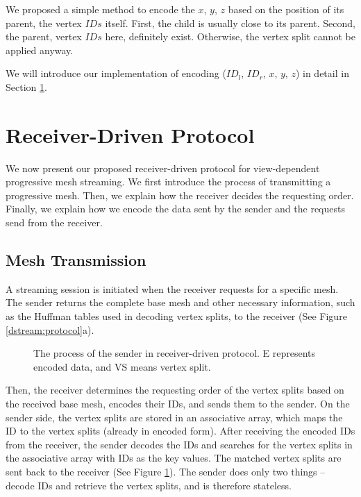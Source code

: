     We proposed a simple method to encode the $x$, $y$, $z$ based on the position
    of its parent, the vertex $IDs$ itself. First, the child is usually close to its
    parent. Second, the parent, vertex $IDs$ here, definitely exist. Otherwise, the vertex
    split cannot be applied anyway. 

    We will introduce our implementation of encoding ($ID_l$, $ID_r$, $x$, $y$, $z$) 
    in detail in Section \ref{s:dstream:protocol}.

\section{Receiver-Driven Protocol}
     \label{s:dstream:protocol}
	 We now present our proposed receiver-driven protocol
     for view-dependent progressive mesh streaming.
     We first introduce the process of transmitting 
     a progressive mesh. Then, we explain how the receiver decides the requesting order.
     Finally, we explain how we encode the data sent by the sender and the requests send from the receiver.
     
     \subsection{Mesh Transmission} 
     A streaming session is initiated when the receiver requests for a specific
     mesh.
     The sender returns the complete base mesh and other necessary information,
     such as the Huffman tables used in decoding vertex splits, to the receiver
     (See Figure \ref{dstream:protocol}a).
     
     \begin{figure}
     \centering
     \caption{The process of the sender in receiver-driven protocol. 
     E represents encoded data, and VS means vertex split. \label{dstream:process}}
     \end{figure}
     Then, the receiver determines
     the requesting order of the vertex splits based on the received base mesh, 
     encodes their IDs, and
     sends them to the sender. On the sender side, the vertex splits are stored
     in an associative array, which maps the ID to the vertex splits (already in encoded form). 
     After receiving the encoded IDs from the receiver, 
     the sender decodes the IDs and searches for the vertex splits 
     in the associative array
     with IDs as the key values. The matched vertex splits
     are sent back to the receiver (See Figure \ref{dstream:process}). 
     The sender does only two things -- decode IDs and retrieve the 
     vertex splits, and is therefore stateless. 

